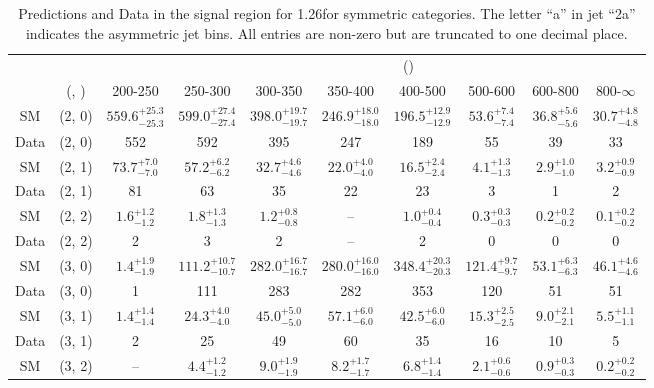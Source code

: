 \begin{table}[h!]
\tiny
\centering
\caption{Predictions and Data in the signal region for 1.26\ifb for symmetric categories. The letter ``a'' in jet \eg ``2a''  indicates the asymmetric jet bins. All entries are non-zero but are truncated to one decimal place.\label{tab:yieldsewkdatapost_sig_comb_sym}}
\begin{tabular}
{cccccccccc}
	\hline\hline
&	&	& \multicolumn{8}{c}{\scalht (\gev)}\\ 
	&	 (\njet, \nb) & 200-250 & 250-300 & 300-350 & 350-400 & 400-500 & 500-600 & 600-800 & 800-$\infty$ \\ [0.8ex] 
\hline
	SM & (2, 0) & $559.6^{+ 25.3 }_{- 25.3 }$ & $599.0^{+ 27.4 }_{- 27.4 }$ & $398.0^{+ 19.7 }_{- 19.7 }$ & $246.9^{+ 18.0 }_{- 18.0 }$ & $196.5^{+ 12.9 }_{- 12.9 }$ & $53.6^{+ 7.4 }_{- 7.4 }$ & $36.8^{+ 5.6 }_{- 5.6 }$ & $30.7^{+ 4.8 }_{- 4.8 }$ \\[0.5ex] 
	Data & (2, 0) & 552 & 592 & 395 & 247 & 189 & 55 & 39 & 33 \\[0.5ex] 
	SM & (2, 1) & $73.7^{+ 7.0 }_{- 7.0 }$ & $57.2^{+ 6.2 }_{- 6.2 }$ & $32.7^{+ 4.6 }_{- 4.6 }$ & $22.0^{+ 4.0 }_{- 4.0 }$ & $16.5^{+ 2.4 }_{- 2.4 }$ & $4.1^{+ 1.3 }_{- 1.3 }$ & $2.9^{+ 1.0 }_{- 1.0 }$ & $3.2^{+ 0.9 }_{- 0.9 }$ \\[0.5ex] 
	Data & (2, 1) & 81 & 63 & 35 & 22 & 23 & 3 & 1 & 2 \\[0.5ex] 
	SM & (2, 2) & $1.6^{+ 1.2 }_{- 1.2 }$ & $1.8^{+ 1.3 }_{- 1.3 }$ & $1.2^{+ 0.8 }_{- 0.8 }$ & -- & $1.0^{+ 0.4 }_{- 0.4 }$ & $0.3^{+ 0.3 }_{- 0.3 }$ & $0.2^{+ 0.2 }_{- 0.2 }$ & $0.1^{+ 0.2 }_{- 0.2 }$ \\[0.5ex] 
	Data & (2, 2) & 2 & 3 & 2 & -- & 2 & 0 & 0 & 0 \\[0.5ex] 
	SM & (3, 0) & $1.4^{+ 1.9 }_{- 1.9 }$ & $111.2^{+ 10.7 }_{- 10.7 }$ & $282.0^{+ 16.7 }_{- 16.7 }$ & $280.0^{+ 16.0 }_{- 16.0 }$ & $348.4^{+ 20.3 }_{- 20.3 }$ & $121.4^{+ 9.7 }_{- 9.7 }$ & $53.1^{+ 6.3 }_{- 6.3 }$ & $46.1^{+ 4.6 }_{- 4.6 }$ \\[0.5ex] 
	Data & (3, 0) & 1 & 111 & 283 & 282 & 353 & 120 & 51 & 51 \\[0.5ex] 
	SM & (3, 1) & $1.4^{+ 1.4 }_{- 1.4 }$ & $24.3^{+ 4.0 }_{- 4.0 }$ & $45.0^{+ 5.0 }_{- 5.0 }$ & $57.1^{+ 6.0 }_{- 6.0 }$ & $42.5^{+ 6.0 }_{- 6.0 }$ & $15.3^{+ 2.5 }_{- 2.5 }$ & $9.0^{+ 2.1 }_{- 2.1 }$ & $5.5^{+ 1.1 }_{- 1.1 }$ \\[0.5ex] 
	Data & (3, 1) & 2 & 25 & 49 & 60 & 35 & 16 & 10 & 5 \\[0.5ex] 
	SM & (3, 2) & -- & $4.4^{+ 1.2 }_{- 1.2 }$ & $9.0^{+ 1.9 }_{- 1.9 }$ & $8.2^{+ 1.7 }_{- 1.7 }$ & $6.8^{+ 1.4 }_{- 1.4 }$ & $2.1^{+ 0.6 }_{- 0.6 }$ & $0.9^{+ 0.3 }_{- 0.3 }$ & $0.2^{+ 0.2 }_{- 0.2 }$ \\[0.5ex] 

\end{tabular}
\end{table}
